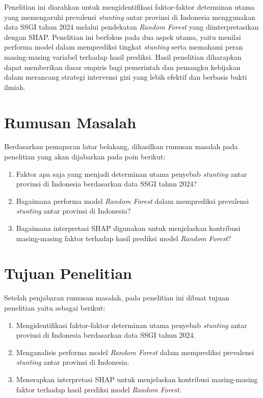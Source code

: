 Penelitian ini diarahkan untuk mengidentifikasi faktor-faktor determinan utama yang memengaruhi prevalensi \textit{stunting} antar provinsi di Indonesia menggunakan data SSGI tahun 2024 melalui pendekatan \textit{Random Forest} yang diinterpretasikan dengan SHAP. Penelitian ini berfokus pada dua aspek utama, yaitu menilai performa model dalam memprediksi tingkat \textit{stunting} serta memahami peran masing-masing variabel terhadap hasil prediksi. Hasil penelitian diharapkan dapat memberikan dasar empiris bagi pemerintah dan pemangku kebijakan dalam merancang strategi intervensi gizi yang lebih efektif dan berbasis bukti ilmiah.

\section{Rumusan Masalah} \label{I.Rumusan Masalah}

Berdasarkan pemaparan latar belakang, dihasilkan rumusan masalah pada penelitian yang akan dijabarkan pada poin berikut: \par

\begin{enumerate}[noitemsep]
	\item Faktor apa saja yang menjadi determinan utama penyebab \textit{stunting} antar provinsi di Indonesia berdasarkan data SSGI tahun 2024?
	\item Bagaimana performa model \textit{Random Forest} dalam memprediksi prevalensi \textit{stunting} antar provinsi di Indonesia?
    \item Bagaimana interpretasi SHAP digunakan untuk menjelaskan kontribusi masing-masing faktor terhadap hasil prediksi model \textit{Random Forest}? 
\end{enumerate}

\section{Tujuan Penelitian} \label{I.Tujuan}
Setelah penjabaran rumusan masalah, pada penelitian ini dibuat tujuan penelitian yaitu sebagai berikut: \par

\begin{enumerate}[noitemsep]
	\item Mengidentifikasi faktor-faktor determinan utama penyebab \textit{stunting} antar provinsi di Indonesia berdasarkan data SSGI tahun 2024. 
	\item Menganalisis performa model \textit{Random Forest} dalam memprediksi prevalensi \textit{stunting} antar provinsi di Indonesia.
    \item Menerapkan interpretasi SHAP untuk menjelaskan kontribusi masing-masing faktor terhadap hasil prediksi model \textit{Random Forest}.
\end{enumerate}

